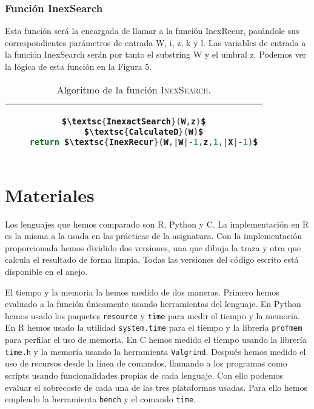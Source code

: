 \documentclass{article}
\newcommand{\tempcaption}{}
\newenvironment{codesnip}[1]{
\begin{table}[h!]
\gdef\tempcaption{#1}
\centering
\begin{tabular}{|c|}
\hline}
{\\\hline
\end{tabular}
\caption{\tempcaption}
\end{table}}
\newcommand{\C}{C }
\newcommand{\R}{R }
\newcommand{\python}{Python }
\begin{document}
\subsubsection{Función InexSearch}

Esta función será la encargada de llamar a la función InexRecur,
pasándole sus correspondientes parámetros de entrada W, i, z, k y l.
Las variables de entrada a la función InexSearch serán por tanto el
substring W y el umbral z.  Podemos ver la lógica de esta función en
la Figura 5.
\\
\begin{codesnip}{Algoritmo de la función \textsc{InexSearch}.\cite{li_durbin_2009}}
\begin{lstlisting}[mathescape=true, language = C]
$\textsc{InexactSearch}(W,z)$
	$\textsc{CalculateD}(W)$
	return $\textsc{InexRecur}(W,|W|-1,z,1,|X|-1)$
\end{lstlisting}
\end{codesnip}

\vspace{-1cm}
\section{Materiales}

Los lenguajes que hemos comparado son R, Python y C. La implementación
en \R es la misma a la usada en las prácticas de la asignatura. Con la
implementación proporcionada hemos dividido  dos  versiones,  una  que
dibuja la traza y otra que calcula el resultado de forma limpia. Todas
las  versiones	del  código  escrito  está  disponible	en  el	anejo.

El tiempo y la memoria la hemos medido de dos maneras.	Primero  hemos
evaluado a la función únicamente usando herramientas del lenguaje.  En
\python hemos usado los paquetes
\lstinline[style=matlab-editor]{resource}\cite{resource_2020} y
\lstinline[style=matlab-editor]{time}\cite{time_2020}  para  medir  el
tiempo	 y   la   memoria.    En   \R	hemos	usado	la    utilidad
\lstinline[style=matlab-editor]{system.time}\cite{system.time_documentation}
para el tiempo y la libreria
\lstinline[style=matlab-editor]{profmem}\cite{bengtsson} para perfilar
el uso de memoria.  En \C{} hemos medido el tiempo usando la  librería
\lstinline[style=matlab-editor]{time.h}\cite{timeh}   y   la   memoria
usando la herramienta
\lstinline[style=matlab-editor]{Valgrind}\cite{Valgrind10}.    Después
hemos medido el uso de recursos desde la línea de comandos, llamando a
los programas como scripts  usando  funcionalidades  propias  de  cada
lenguaje.  Con ello podemos evaluar el sobrecoste de cada una  de  las
tres plataformas usadas.  Para	ello  hemos  empleado  la  herramienta
\lstinline[style=matlab-editor]{bench}\cite{GitHubGa29} y  el  comando
\lstinline[style=matlab-editor]{time}\cite{timeh}.
\end{document}
